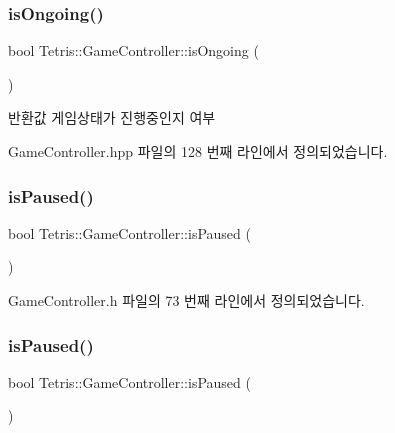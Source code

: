 \subsubsection{\texorpdfstring{is\+Ongoing()}{isOngoing()}\hspace{0.1cm}{\footnotesize\ttfamily [2/2]}}
{\footnotesize\ttfamily bool Tetris\+::\+Game\+Controller\+::is\+Ongoing (\begin{DoxyParamCaption}{ }\end{DoxyParamCaption})\hspace{0.3cm}{\ttfamily [inline]}}

\begin{DoxyReturn}{반환값}
게임상태가 진행중인지 여부 
\end{DoxyReturn}


Game\+Controller.\+hpp 파일의 128 번째 라인에서 정의되었습니다.

\mbox{\label{class_tetris_1_1_game_controller_a18e513f45750361e14af091704e9f1d4}} 
\subsubsection{\texorpdfstring{is\+Paused()}{isPaused()}\hspace{0.1cm}{\footnotesize\ttfamily [1/2]}}
{\footnotesize\ttfamily bool Tetris\+::\+Game\+Controller\+::is\+Paused (\begin{DoxyParamCaption}{ }\end{DoxyParamCaption})\hspace{0.3cm}{\ttfamily [inline]}}



Game\+Controller.\+h 파일의 73 번째 라인에서 정의되었습니다.

\mbox{\label{class_tetris_1_1_game_controller_a18e513f45750361e14af091704e9f1d4}} 
\subsubsection{\texorpdfstring{is\+Paused()}{isPaused()}\hspace{0.1cm}{\footnotesize\ttfamily [2/2]}}
{\footnotesize\ttfamily bool Tetris\+::\+Game\+Controller\+::is\+Paused (\begin{DoxyParamCaption}{ }\end{DoxyParamCaption})\hspace{0.3cm}{\ttfamily [inline]}}

